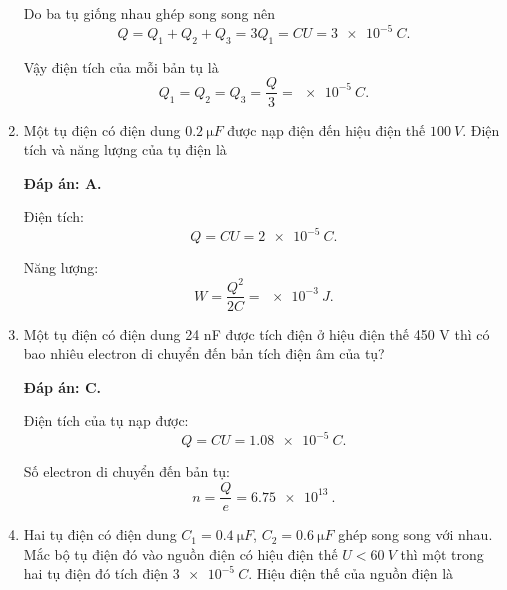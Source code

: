 \begin{enumerate}[label=\bfseries Câu \arabic*:]
{		Do ba tụ giống nhau ghép song song nên
		$$Q=Q_1+Q_2+Q_3=3Q_1=CU=\SI{3e-5}{C}.$$
		
		Vậy điện tích của mỗi bản tụ là
		$$Q_1=Q_2=Q_3=\dfrac{Q}{3} = \SI{e-5}{C}.$$
	}
	\item {}
	
	\cauhoi
	{Một tụ điện có điện dung $\SI{0.2}{\micro F}$ được nạp điện đến hiệu điện thế $\SI{100}{V}$. Điện tích và năng lượng của tụ điện là
		
	}
	\loigiai
	{	\textbf{Đáp án: A.}
		
		Điện tích:
		$$Q=CU = \SI{2e-5}{C}.$$
		
		Năng lượng:
		$$W=\dfrac{Q^2}{2C} = \SI{e-3}{J}.$$
	}
	\item {}
	
	\cauhoi
	{Một tụ điện có điện dung 24 nF được tích điện ở hiệu điện thế 450 V thì có bao nhiêu electron di chuyển đến bản tích điện âm của tụ?
		
	}
	\loigiai
	{	\textbf{Đáp án: C.}
		
		Điện tích của tụ nạp được:
		$$Q=CU = \SI{1.08e-5}{C}.$$
		
		Số electron di chuyển đến bản tụ:
		$$n=\dfrac{Q}{e} = \SI{6.75e13}{}.$$
	}
	\item {}
	
	\cauhoi
	{Hai tụ điện có điện dung $C_1=\SI{0.4}{\micro F}$, $C_2=\SI{0.6}{\micro F}$ ghép song song với nhau. Mắc bộ tụ điện đó vào nguồn điện có hiệu điện thế $U < \SI{60}{V}$ thì một trong hai tụ điện đó tích điện $\SI{3e-5}{C}$. Hiệu điện thế của nguồn điện là
		
}
\end{enumerate}

